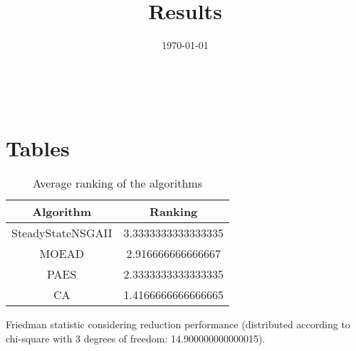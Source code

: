\documentclass{article}
\title{Results}
\author{}
\date{\today}
\begin{document}
\oddsidemargin 0in \topmargin 0in\maketitle
\
\section{Tables}
\begin{table}[!htp]
\centering
\caption{Average ranking of the algorithms}
\begin{tabular}{c|c}
Algorithm&Ranking\\
\hline
SteadyStateNSGAII&3.3333333333333335\\
MOEAD&2.916666666666667\\
PAES&2.3333333333333335\\
CA&1.4166666666666665\\
\end{tabular}
\end{table}


Friedman statistic considering reduction performance (distributed according to chi-square with 3 degrees of freedom: 14.900000000000015).
\end{document}
